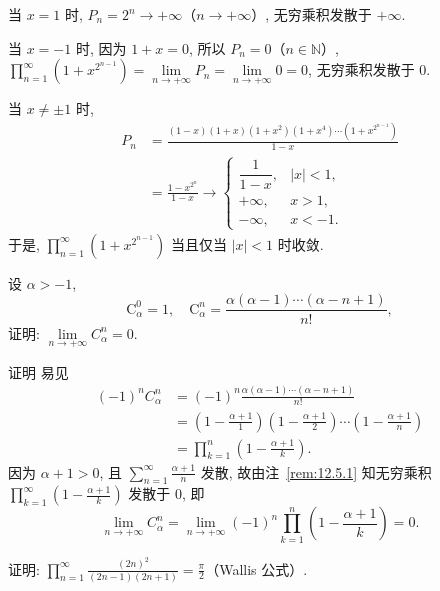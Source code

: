 当 $x=1$ 时, $P_{n}=2^{n}\to+\infty$（$n\to+\infty$）, 无穷乘积发散于 $+\infty$.

当 $x=-1$ 时, 因为 $1+x=0$, 所以 $P_{n}=0$（$n\in\mathbb{N}$）, $\prod_{n=1}^{\infty}(1+x^{2^{n-1}})=\lim\limits_{n\to+\infty}P_{n}=\lim\limits_{n\to+\infty}0=0$, 无穷乘积发散于 $0$.

当 $x\neq\pm1$ 时,
\[
  \begin{aligned}
    P_{n}&=\frac{(1-x)(1+x)(1+x^{2})(1+x^{4})\cdots(1+x^{2^{n-1}})}{1-x}\\
    &=\frac{1-x^{2^{n}}}{1-x}\xrightarrow{}\left\{\begin{array}
{ll}
      \dfrac{1}{1-x}, & |x|<1,\\[8pt]
      +\infty, & x>1,\\[2pt]
      -\infty, & x<-1.
\end{array}\right.
  \end{aligned}
\]
于是, $\prod_{n=1}^{\infty}(1+x^{2^{n-1}})$ 当且仅当 $|x|<1$ 时收敛.

\begin{example}\label{ex:12.5.9}
设 $\alpha>-1$,
\[
  \mathrm{C}_{\alpha}^{0}=1,\quad\mathrm{C}_{\alpha}^{n}=\frac{\alpha(\alpha-1)\cdots(\alpha-n+1)}{n!},
\]
证明: $\lim\limits_{n\to+\infty}C_{\alpha}^{n}=0$.
\end{example}

证明 易见
\[
  \begin{aligned}
    (-1)^{n}C_{\alpha}^{n}&=(-1)^{n}\frac{\alpha(\alpha-1)\cdots(\alpha-n+1)}{n!}\\
    &=\left(1-\frac{\alpha+1}{1}\right)\left(1-\frac{\alpha+1}{2}\right)\cdots\left(1-\frac{\alpha+1}{n}\right)\\
    &=\prod_{k=1}^{n}\left(1-\frac{\alpha+1}{k}\right).
  \end{aligned}
\]
因为 $\alpha+1>0$, 且 $\sum_{n=1}^{\infty}\frac{\alpha+1}{n}$ 发散, 故由注~\ref{rem:12.5.1} 知无穷乘积 $\prod_{k=1}^{\infty}\left(1-\frac{\alpha+1}{k}\right)$ 发散于 $0$, 即
\[
  \lim_{n\to+\infty}C_{\alpha}^{n}=\lim_{n\to+\infty}(-1)^{n}\prod_{k=1}^{n}\left(1-\frac{\alpha+1}{k}\right)=0.
\]

\begin{example}\label{ex:12.5.10}
证明: $\prod_{n=1}^{\infty}\frac{(2n)^{2}}{(2n-1)(2n+1)}=\frac{\pi}{2}$（Wallis 公式）.
\end{example}

